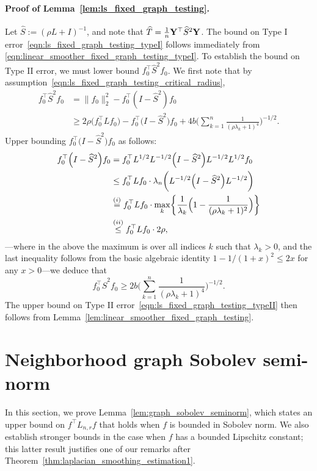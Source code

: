 \documentclass[twoside]{article}
\newcommand{\1}{\mathbf{1}}
\newcommand{\Lap}{L}
\newcommand{\Id}{I}
\newcommand{\wh}[1]{\widehat{#1}}
\theoremstyle{definition}
\theoremstyle{remark}
\begin{document}
\paragraph{Proof of Lemma~\ref{lem:ls_fixed_graph_testing}.}
Let $\wh{S} := (\rho \Lap + \Id)^{-1}$, and note that $\wh{T} = \frac{1}{n}{\bf Y}^{\top} \wh{S}^2 {\bf Y}$. The bound on Type I error~\eqref{eqn:ls_fixed_graph_testing_typeI} follows immediately from \eqref{eqn:linear_smoother_fixed_graph_testing_typeI}. 
To establish the bound on Type II error, we must lower bound $f_0^{\top} \wh{S}^2 f_0$. We first note that by assumption~\eqref{eqn:ls_fixed_graph_testing_critical_radius},
\begin{align*}
f_0^{\top} \wh{S}^2 f_0 & = \bigl\|f_0\bigr\|_2^2 - f_0^{\top}(I - \wh{S}^2)f_0 \\
& \geq 2 \rho \bigl(f_0^{\top} \Lap f_0\bigr) - f_0^{\top}\bigl(I - \wh{S}^2\bigr)f_0 + 4b \Biggl(\sum_{k = 1}^{n} \frac{1}{(\rho\lambda_k + 1)^4} \Biggr)^{-1/2}.
\end{align*}
Upper bounding $f_0^{\top}\bigl(I - \wh{S}^2\bigr)f_0$ as follows:
\begin{equation*}
\begin{aligned}
f_0^{\top} \Bigl(\Id - \wh{S}^2\Bigr) f_0  & = f_0^{\top} \Lap^{1/2} \Lap^{-1/2}\Bigl(\Id - \wh{S}^2\Bigr) \Lap^{-1/2} \Lap^{1/2} f_0 \\ 
& \leq f_0^{\top} \Lap f_0 \cdot  \lambda_{n}\biggl(\Lap^{-1/2}\Bigl(\Id - \wh{S}^2\Bigr) \Lap^{-1/2}\biggr) \\ 
& \overset{(i)}{=}  f_0^{\top} \Lap f_0 \cdot \max_{k} \biggl\{ \frac{1}{\lambda_k} \Bigl(1 - \frac{1}{(\rho \lambda_k + 1)^2}\Bigr) \biggr\} \\
& \overset{(ii)}{\leq} f_0^{\top} \Lap f_0 \cdot 2\rho,
\end{aligned}
\end{equation*}
---where in the above the maximum is over all indices $k$ such that $\lambda_k > 0$, and the last inequality follows from the basic algebraic identity $1 - 1/(1 + x)^2 \leq 2 x$ for any $x > 0$---we deduce that
\begin{equation*}
f_0^{\top} \wh{S}^2 f_0 \geq 2b \biggl(\sum_{k = 1}^{n} \frac{1}{(\rho\lambda_k + 1)^4} \biggr)^{-1/2}.
\end{equation*} 
The upper bound on Type II error~\eqref{eqn:ls_fixed_graph_testing_typeII} then follows from Lemma~\ref{lem:linear_smoother_fixed_graph_testing}.

\section{Neighborhood graph Sobolev semi-norm}
\label{sec:graph_sobolev_seminorm}
In this section, we prove Lemma~\ref{lem:graph_sobolev_seminorm}, which states an upper bound on $f^{\top} \Lap_{n,r} f$ that holds when $f$ is bounded in Sobolev norm. We also establish stronger bounds in the case when $f$ has a bounded Lipschitz constant; this latter result justifies one of our remarks after Theorem~\ref{thm:laplacian_smoothing_estimation1}. 
\end{document}
